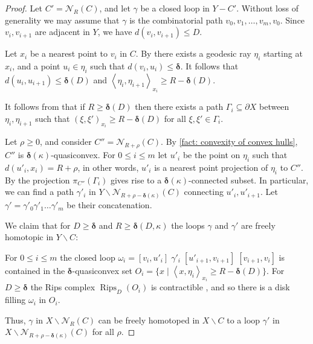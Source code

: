 \documentclass{amsart}
\numberwithin{equation}{section}
\theoremstyle{definition}
\newcommand{\calN}{\mathcal{N}}
\newcommand{\gen}[1]{\left< #1 \right>}
\newcommand{\bdelta}{{\boldsymbol\delta}}
\newcommand{\ssm}{\smallsetminus}
\newcommand{\mahan}[1]{\todo[inline, color=cyan]{#1}}
\newcommand{\nir}[1]{\todo[inline, color=magenta]{#1}}
\DeclareMathOperator{\Rips}{Rips}
\begin{document}
    \begin{proof}
        Let $C' =\calN_R(C)$, and let $\gamma$ be a closed loop in $Y-C'$. 
        Without loss of generality we may assume that $\gamma$ is the combinatorial path $v_0,v_1,\dots,v_{m},v_0$. Since $v_i,v_{i+1}$ are adjacent in $Y$, we have $d(v_i,v_{i+1})\le D$.

        Let $x_i$ be a nearest point to $v_i$ in $C$.
        By \cite[Lemma 3.1]{bestvina1991boundary} there exists a geodesic ray $\eta_i$ starting at $x_i$, and a point $u_i\in \eta_i$ such that $d(v_i,u_i)\le \bdelta$.
        It follows that $d(u_i,u_{i+1})\le \bdelta(D)$ and $\gen{\eta_i,\eta_{i+1}}_{x_i}\ge R-\bdelta(D)$.

        It follows from \cite[Lemma 6.1 (1)]{lazarovich2023commensurated} that if $R\ge \bdelta(D)$ then there exists a path $\Gamma_i\subseteq\partial X$ between $\eta_i,\eta_{i+1}$ such that
        $(\xi,\xi')_{x_i}\ge R-\bdelta(D)$ for all $\xi,\xi'\in \Gamma_i$.

        Let $\rho\ge 0$, and consider $C'' = \calN_{R+\rho}(C)$. 
        By \ref{fact: convexity of convex hulls}, $C''$ is $\bdelta(\kappa)$-quasiconvex.
        For $0\le i\le m$ let $u'_i$ be the point on $\eta_i$ such that $d(u'_i,x_i) = R+\rho$, in other words, $u'_i$ is a nearest point projection of $\eta_i$ to $C''$.
        By  the projection $\pi_{C''}(\Gamma_i)$ gives rise to a $\bdelta(\kappa)$-connected subset.
        In particular, we can find a path $\gamma'_i$ in $Y\ssm \calN_{R+\rho-\bdelta(\kappa)}(C)$  connecting $u'_i,u'_{i+1}.$
        Let $\gamma' = \gamma'_0 \gamma'_1\dots \gamma'_m$ be their concatenation.

        We claim that for $D\ge \bdelta$ and $R\ge \bdelta(D,\kappa)$ the loops $\gamma$ and $\gamma'$ are freely homotopic in $Y\ssm C$:

        For $0\le i\le m$ the closed loop $\omega_i = [v_i,u'_i]\;\gamma'_i\;[u'_{i+1},v_{i+1}]\;[v_{i+1},v_i]$
        is contained in the $\bdelta$-quasiconvex set $O_i = \{x\;|\;\gen{x,\eta_i}_{x_i}\ge R-\bdelta(D)\}.$ 
        For $D\ge \bdelta$ the Rips complex $\Rips_D(O_i)$ is contractible \cite[Ch.4]{GhH},
        and so there is a disk filling $\omega_i$ in $O_i$.
        
        

        Thus, $\gamma$ in $X\ssm \calN_R(C)$ can be freely homotoped in $X\ssm C$ to a loop $\gamma'$ in $X\ssm \calN_{R+\rho - \bdelta(\kappa)}(C)$ for all $\rho$. 
    \end{proof}
\end{document}
